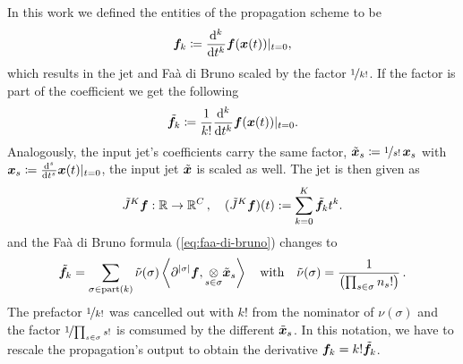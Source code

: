 In this work we defined the entities of the propagation scheme to be 
\begin{equation*}
{\bm{f}}_k \coloneqq \frac{\mathrm{d}^k}{\mathrm{d}t^k} {\bm{f}}({\bm{x}}(t)) |_{t=0},
\end{equation*}
which results in the jet and Faà di Bruno scaled by the factor $\nicefrac{1}{k!}$.
If the factor is part of the coefficient we get the following
\begin{equation*}
\Tilde{{\bm{f}}}_k \coloneqq \frac{1}{k!} \frac{\mathrm{d}^k}{\mathrm{d}t^k} {\bm{f}}({\bm{x}}(t)) |_{t=0}.
\end{equation*}
Analogously, the input jet's coefficients carry the same factor, $\Tilde{{\bm{x}}}_s \coloneqq \nicefrac{1}{s!}\, {\bm{x}}_s$ with ${\bm{x}}_s \coloneqq \frac{\mathrm{d}^s}{\mathrm{d}t^s} {\bm{x}}(t) |_{t=0}$, \ie the input jet $\Tilde{{\bm{x}}}$ is scaled as well.
The jet is then given as
\begin{align*}
  \Tilde{J}^K {\bm{f}} : {\mathbb{R}} \to {\mathbb{R}}^C\,,
  \quad (\Tilde{J}^K {\bm{f}})(t) := \sum_{k=0}^K\Tilde{{\bm{f}}}_k t^k. 
\end{align*}
and the Faà di Bruno formula (\cref{eq:faa-di-bruno}) changes to
\begin{align}
  \label{eq:faa-di-bruno-scaled}
  \Tilde{{\bm{f}}}_k
  =
  \sum_{\sigma \in \operatorname{part}(k)}
  \Tilde{\nu}(\sigma)
  \left<
  \partial^{|\sigma|} {\bm{f}},
  \mathbin{\mathop{\otimes}\limits_{s \in \sigma}} \Tilde{{\bm{x}}}_s
  \right>
  \quad
  \text{with}
  \quad
  \Tilde{\nu}(\sigma)
  =
  \frac{1}{
    \left(
      \prod_{s \in \sigma
      }
      n_s!
    \right)
  }\,.
\end{align}
The prefactor $\nicefrac{1}{k!}$ was cancelled out with $k!$ from the nominator of
$\nu(\sigma)$ and the factor $\nicefrac{1}{\prod_{s \in \sigma} s!}$ is comsumed by the different $\tilde{{\bm{x}}}_s$.
In this notation, we have to rescale the propagation's output to obtain the derivative ${\bm{f}}_k = k! \Tilde{{\bm{f}}}_k$.